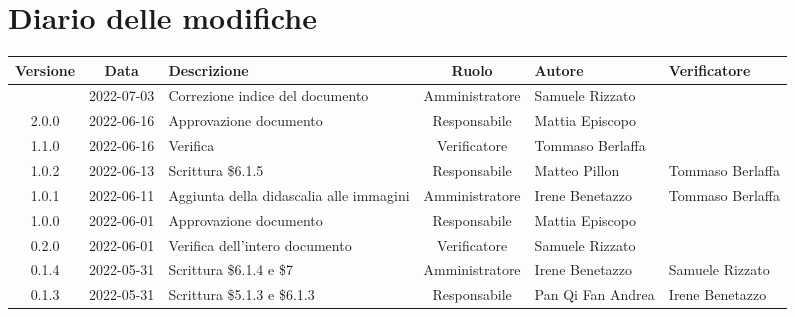 \section*{Diario delle modifiche}
	\begin{center}
	\renewcommand{\arraystretch}{1.8} %
	\begin{longtable}{ |c|c|p{8em}|c|m{5em}|m{5em}| }
	\hline
	\textbf{Versione} & \textbf{Data} & \textbf{Descrizione} &  \textbf{Ruolo} &  \textbf{Autore} & \textbf{Verificatore}\\ %
	\hline %
	 & 2022-07-03 & Correzione indice del documento & Amministratore & Samuele \newline Rizzato & \\
	\hline
	2.0.0 & 2022-06-16 & Approvazione documento & Responsabile & Mattia \newline Episcopo & \\
	\hline 
	1.1.0 & 2022-06-16 & Verifica & Verificatore & Tommaso \newline Berlaffa & \\
	\hline 
  1.0.2 & 2022-06-13 & Scrittura \$6.1.5 & Responsabile & Matteo \newline Pillon & Tommaso \newline Berlaffa\\
	\hline 
	1.0.1 & 2022-06-11 & Aggiunta della didascalia alle immagini & Amministratore & Irene \newline Benetazzo & Tommaso \newline Berlaffa\\
	\hline 
	1.0.0 & 2022-06-01 & Approvazione documento & Responsabile & Mattia \newline Episcopo & \\
	\hline 
	0.2.0 & 2022-06-01 & Verifica dell'intero documento & Verificatore & Samuele \newline Rizzato & \\
	\hline 
	0.1.4 & 2022-05-31 & Scrittura \$6.1.4 e \$7 & Amministratore & Irene \newline Benetazzo & Samuele \newline Rizzato\\
	\hline 
	0.1.3 & 2022-05-31 & Scrittura \$5.1.3 e \$6.1.3 & Responsabile & Pan Qi Fan \newline Andrea & Irene \newline Benetazzo \\

\end{longtable}
\end{center}
